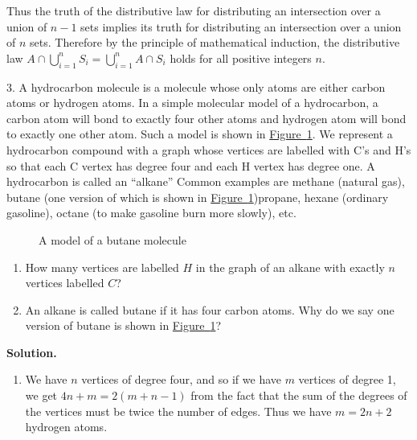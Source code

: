 \documentclass[10pt,]{book}
\theoremstyle{plain}
\theoremstyle{definition}
\theoremstyle{definition}
\numberwithin{equation}{chapter}
\begin{document}
\begin{exerciselist}
%
\par
Thus the truth of the distributive law for distributing an intersection over a union of \(n-1\) sets implies its truth for distributing an intersection over a union of \(n\) sets. Therefore by the principle of mathematical induction, the distributive law \(\displaystyle A\cap\bigcup_{i=1}^nS_i=
\bigcup_{i=1}^nA\cap S_i\) holds for all positive integers \(n\).%
\item[3.]\hypertarget{exercise-15}{}A hydrocarbon molecule is a molecule whose only atoms are either carbon atoms or hydrogen atoms.  In a simple molecular model of a hydrocarbon, a carbon atom will bond to exactly four other atoms and hydrogen atom will bond to exactly one other atom. Such a model is shown in \hyperref[butane]{Figure~\ref{butane}}. We represent a hydrocarbon compound with a graph whose vertices are labelled with C's and H's so that each C vertex has degree four and each H vertex has degree one.  A hydrocarbon is called an ``alkane'' Common examples are methane (natural gas), butane (one version of which is shown in \hyperref[butane]{Figure~\ref{butane}})propane, hexane (ordinary gasoline), octane (to make gasoline burn more slowly), etc.%
\begin{figure}
\centering
{
}
\caption{A model of a butane molecule\label{butane}}
\end{figure}
\leavevmode%
\begin{enumerate}[label=(\alph*)]
\item\hypertarget{li-32}{}How many vertices are labelled \(H\) in the graph of an alkane with exactly \(n\) vertices labelled \(C\)?%
\item\hypertarget{li-33}{}An alkane is called butane if it has four carbon atoms. Why do we say one version of butane is shown in \hyperref[butane]{Figure~\ref{butane}}?%
\end{enumerate}
%
\par\smallskip
\par\smallskip
\noindent\textbf{Solution.}\hypertarget{solution-182}{}\quad
\leavevmode%
\begin{enumerate}[label=(\alph*)]
\item\hypertarget{li-34}{}We have \(n\) vertices of degree four, and so if we have \(m\) vertices of degree 1, we get \(4n+m=2(m+n-1)\) from the fact that the sum of the degrees of the vertices must be twice the number of edges. Thus we have \(m=2n+2\) hydrogen atoms.%

\end{enumerate}
\end{exerciselist}
\end{document}
